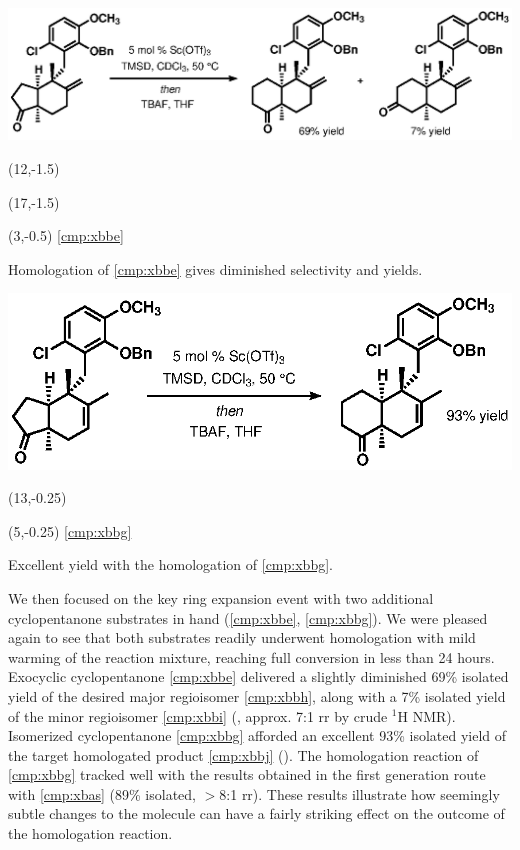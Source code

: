 \begin{Scheme}[h]
  \centering \includegraphics[scale=0.8]{chp_singlecarbon/images/homotwoexocyclic}
 \begin{textblock}{1}(12,-1.5)  \end{textblock}
 \begin{textblock}{1}(17,-1.5)  \end{textblock}
\begin{textblock}{1}(3,-0.5) \textsf{\scriptsize{\ref{cmp:xbbe}}} \end{textblock}
  \caption{Homologation of \ref{cmp:xbbe} gives diminished selectivity and yields.}
  \label{sch:homotwoexocyclic}
\end{Scheme}
\begin{Scheme}[b]
  \centering \includegraphics[scale=0.8]{chp_singlecarbon/images/homotwotrisub}
 \begin{textblock}{1}(13,-0.25)  \end{textblock}
 \begin{textblock}{1}(5,-0.25) \textsf{\scriptsize{\ref{cmp:xbbg}}} \end{textblock}
  \caption{Excellent yield with the homologation of \ref{cmp:xbbg}.}
  \label{sch:homotwotrisub}
\end{Scheme}
We then focused on the key ring expansion event with two additional cyclopentanone substrates in
hand (\ref{cmp:xbbe}, \ref{cmp:xbbg}). We were pleased again to see that both substrates readily
underwent homologation with mild warming of the reaction mixture, reaching full conversion in less
than 24 hours.
Exocyclic cyclopentanone \ref{cmp:xbbe} delivered a slightly diminished 69\% isolated yield of the desired major regioisomer
\ref{cmp:xbbh}, along with a 7\% isolated yield of the minor regioisomer \ref{cmp:xbbi}
(, approx.
7:1 rr by crude $^1$H NMR).
Isomerized cyclopentanone \ref{cmp:xbbg} afforded an excellent 93\% isolated yield of the target
homologated product \ref{cmp:xbbj} (). The homologation reaction of
\ref{cmp:xbbg} tracked well with the results obtained in the first generation route with \ref{cmp:xbas} (89\% isolated, $>$8:1 rr). These results
illustrate how seemingly subtle changes to the molecule can have a fairly striking effect on the
outcome of the homologation reaction. 
 
